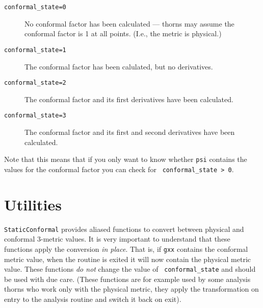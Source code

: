 \documentclass{article}
\begin{document}
\begin{description}
\item[{\tt conformal\_state=0}] 
No conformal factor has been calculated --- thorns may
assume the conformal factor is 1 at all points.
(I.e., the metric is physical.)
\item[{\tt conformal\_state=1}] 
The conformal factor has been calulated, but no derivatives.
\item[{\tt conformal\_state=2}]
The conformal factor and its first derivatives have been calculated.
\item[{\tt conformal\_state=3}]
The conformal factor and its first and second derivatives have been calculated.
\end{description}

Note that this means that if you only want to know whether {\tt psi} contains 
the values for the conformal factor you can check for {\tt
conformal\_state > 0}.

\section{Utilities}

{\tt StaticConformal} provides aliased functions to convert between
physical and conformal 3-metric values.  It is very important to
understand that these functions apply the conversion {\em in place}.
That is, if {\tt gxx} contains the conformal metric value, when the
routine is exited it will now contain the physical metric value.
These functions {\em do not} change the value of {\tt
conformal\_state} and should be used with due care.  (These functions
are for example used by some analysis thorns who work only with the
physical metric, they apply the transformation on entry to the
analysis routine and switch it back on exit).
\end{document}
